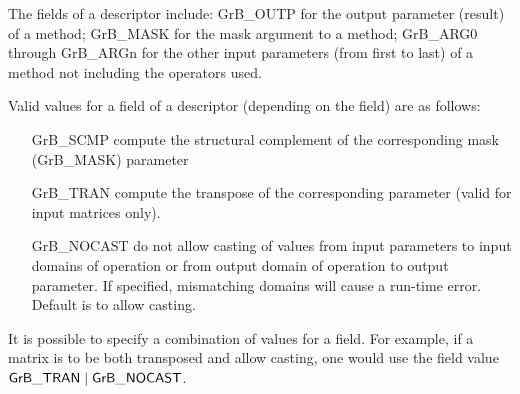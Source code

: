 The fields of a descriptor include: {\sf GrB\_OUTP} for the output parameter 
(result) of a method; {\sf GrB\_MASK} for the mask argument to a method; 
{\sf GrB\_ARG0} through {\sf GrB\_ARGn} for the other input parameters 
(from first to last) of a method not including the operators used.

Valid values for a field of a descriptor (depending on the field) are as follows:

\begin{itemize}[leftmargin=1.5in]
\item[{\sf GrB\_SCMP}]   compute the structural complement of the corresponding mask
                         (GrB\_MASK) parameter
\item[{\sf GrB\_TRAN}]   compute the transpose of the corresponding parameter (valid
                         for input matrices only).
\item[{\sf GrB\_NOCAST}] do not allow casting of values from input parameters to input domains 
                         of operation or from output domain of operation to output 
                         parameter. If specified, mismatching domains will cause a 
                         run-time error. Default is to allow casting.
\end{itemize}

It is possible to specify a combination of values for a field. For 
example, if a matrix is to be both transposed and allow casting, one would use the field value
${\sf GrB\_TRAN} \mid {\sf GrB\_NOCAST}$.  





